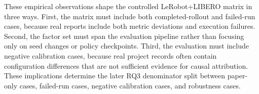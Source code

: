 These empirical observations shape the controlled LeRobot+LIBERO matrix in three ways. First, the matrix must include both completed-rollout and failed-run cases, because real reports include both metric deviations and execution failures. Second, the factor set must span the evaluation pipeline rather than focusing only on seed changes or policy checkpoints. Third, the evaluation must include negative calibration cases, because real project records often contain configuration differences that are not sufficient evidence for causal attribution. These implications determine the later RQ3 denominator split between paper-only cases, failed-run cases, negative calibration cases, and robustness cases.
